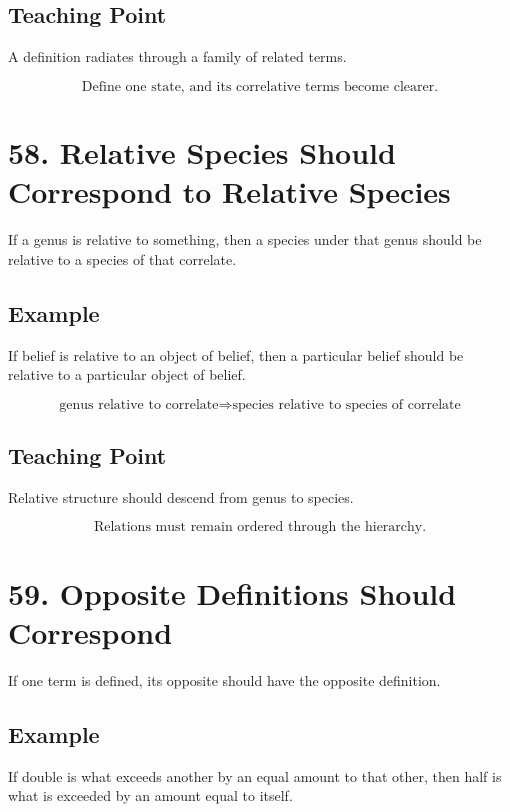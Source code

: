 \documentclass[12pt]{article}
\begin{document}
\subsection*{Teaching Point}

A definition radiates through a family of related terms.

\[
\boxed{
\text{Define one state, and its correlative terms become clearer.}
}
\]

\section*{58. Relative Species Should Correspond to Relative Species}

If a genus is relative to something, then a species under that genus should be
relative to a species of that correlate.

\subsection*{Example}

If belief is relative to an object of belief, then a particular belief should be
relative to a particular object of belief.

\[
\text{genus relative to correlate}
\Rightarrow
\text{species relative to species of correlate}
\]

\subsection*{Teaching Point}

Relative structure should descend from genus to species.

\[
\boxed{
\text{Relations must remain ordered through the hierarchy.}
}
\]

\section*{59. Opposite Definitions Should Correspond}

If one term is defined, its opposite should have the opposite definition.

\subsection*{Example}

If double is what exceeds another by an equal amount to that other, then half is
what is exceeded by an amount equal to itself.
\end{document}
